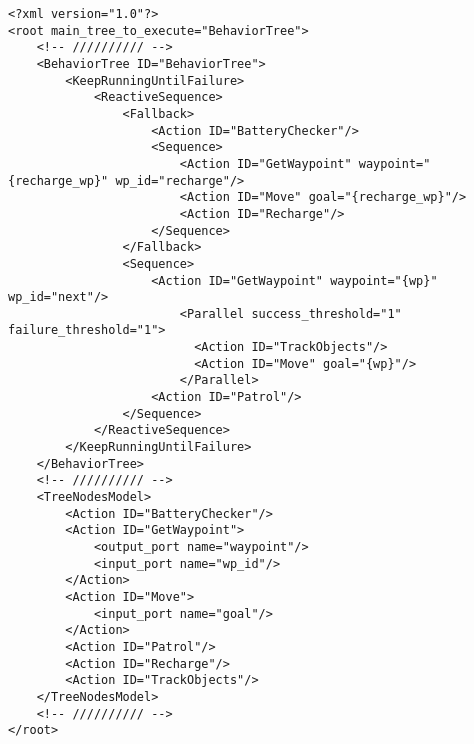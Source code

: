  \footnotesize
\begin{tcolorbox}[sharp corners, colframe=gray!80, colback=LightGray, left=0pt, top=0pt, bottom=0pt, title=\texttt{br2\_bt\_patrolling/behavior\_tree\_xml/patrolling.xml}]
  \begin{verbatim}
<?xml version="1.0"?>
<root main_tree_to_execute="BehaviorTree">
    <!-- ////////// -->
    <BehaviorTree ID="BehaviorTree">
        <KeepRunningUntilFailure>
            <ReactiveSequence>
                <Fallback>
                    <Action ID="BatteryChecker"/>
                    <Sequence>
                        <Action ID="GetWaypoint" waypoint="{recharge_wp}" wp_id="recharge"/>
                        <Action ID="Move" goal="{recharge_wp}"/>
                        <Action ID="Recharge"/>
                    </Sequence>
                </Fallback>
                <Sequence>
                    <Action ID="GetWaypoint" waypoint="{wp}" wp_id="next"/>
                        <Parallel success_threshold="1" failure_threshold="1">
                          <Action ID="TrackObjects"/>
                          <Action ID="Move" goal="{wp}"/>
                        </Parallel>
                    <Action ID="Patrol"/>
                </Sequence>
            </ReactiveSequence>
        </KeepRunningUntilFailure>
    </BehaviorTree>
    <!-- ////////// -->
    <TreeNodesModel>
        <Action ID="BatteryChecker"/>
        <Action ID="GetWaypoint">
            <output_port name="waypoint"/>
            <input_port name="wp_id"/>
        </Action>
        <Action ID="Move">
            <input_port name="goal"/>
        </Action>
        <Action ID="Patrol"/>
        <Action ID="Recharge"/>
        <Action ID="TrackObjects"/>
    </TreeNodesModel>
    <!-- ////////// -->
</root>

    \end{verbatim}
    \end{tcolorbox}
  \normalsize

